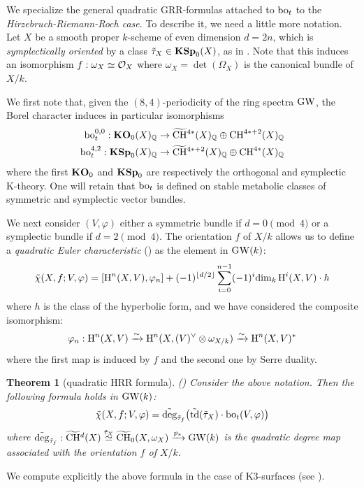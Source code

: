 \documentclass[11pt,leqno]{amsart}
\newtheorem{thmi}{Theorem}
\theoremstyle{remark}
\theoremstyle{definition}
\numberwithin{equation}{thm}
\begin{document}
\bigskip

We specialize the general quadratic GRR-formulas attached to $\operatorname{bo}_t$
 to the \emph{Hirzebruch-Riemann-Roch case}.
 To describe it, we need a little more notation.
 Let $X$ be a smooth proper $k$-scheme of even dimension $d=2n$,
 which is \emph{symplectically oriented} by a class $\tilde \tau_X \in \mathbf{KSp}_0(X)$,
 as in . Note that this induces
 an isomorphism $f:\omega_X \simeq \mathcal O_X$ where $\omega_X=\det(\Omega_X)$ is the canonical
 bundle of $X/k$.%

We first note that, given the $(8,4)$-periodicity of the ring spectra $\operatorname{GW}$,
 the Borel character induces in particular isomorphisms
\begin{align*}
\operatorname{bo}_t^{0,0}:\mathbf{KO}_0(X)_{\mathbb{Q}} &\rightarrow \widetilde{\operatorname{CH}}{}^{4*}(X)_{\mathbb{Q}} \oplus \operatorname{CH}^{4*+2}(X)_{\mathbb{Q}} \\
\operatorname{bo}_t^{4,2}:\mathbf{KSp}_0(X)_{\mathbb{Q}} &\rightarrow \widetilde{\operatorname{CH}}{}^{4*+2}(X)_{\mathbb{Q}} \oplus \operatorname{CH}^{4*}(X)_{\mathbb{Q}}
\end{align*}
where the first $\mathbf{KO}_0$ and $\mathbf{KSp}_0$ are respectively the orthogonal
 and symplectic K-theory. One will retain that $\operatorname{bo}_t$ is defined on stable metabolic
 classes of symmetric and symplectic vector bundles.

We next consider $(V,\varphi)$ either a symmetric bundle if $d=0\pmod 4$ or a symplectic bundle if $d=2\pmod 4$.
The orientation $f$ of $X/k$ allows us to define a \emph{quadratic Euler characteristic}
 () as the element in $\operatorname{GW}(k)$:
$$
\tilde \chi(X,f;V,\varphi)=
[\operatorname{H}^n(X,V),\varphi_n]+(-1)^{\lfloor d/2 \rfloor}\sum_{i=0}^{n-1}(-1)^{i}\mathrm{dim}_k\operatorname{H}^i(X,V)\cdot h
$$
where $h$ is the class of the hyperbolic form, and we have considered the composite isomorphism:
$$
\varphi_n:\operatorname{H}^n(X,V) \xrightarrow \sim \operatorname{H}^n(X,(V)^\vee\otimes\omega_{X/k})
 \xrightarrow \sim \operatorname{H}^{n}(X,V)^*
$$
where the first map is induced by $f$ and the second one by Serre duality.
\begin{thmi}[quadratic HRR formula]() \label{thmi:HRR}
Consider the above notation. Then the following formula holds in $\operatorname{GW}(k)$:
$$
\tilde \chi(X,f;V,\varphi)=\tilde{\operatorname{deg}}_{\tilde \tau_f}\big(\tilde {\operatorname{td}}(\tilde \tau_X)\cdot \operatorname{bo}_t(V,\varphi)\big)
$$
where $\tilde{\operatorname{deg}}_{\tilde \tau_f}:\widetilde{\operatorname{CH}}{}^d(X) \stackrel{\tilde \tau_X}\simeq \widetilde{\operatorname{CH}}_0(X,\omega_X) \xrightarrow{p_*} \operatorname{GW}(k)$
 is the quadratic degree map associated with the orientation $f$ of $X/k$.
\end{thmi}
We compute explicitly the above formula in the case of K3-surfaces (see ).
\end{document}
